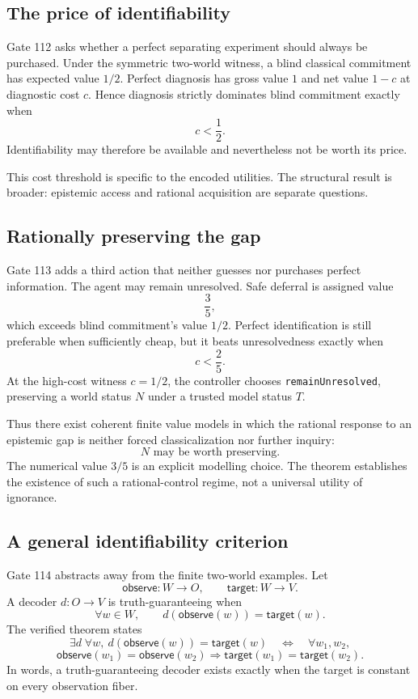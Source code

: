 \subsection{The price of identifiability}

Gate 112 asks whether a perfect separating experiment should always be purchased. Under the symmetric two-world witness, a blind classical commitment has expected value $1/2$. Perfect diagnosis has gross value $1$ and net value $1-c$ at diagnostic cost $c$. Hence diagnosis strictly dominates blind commitment exactly when
\[
c<\frac12.
\]
Identifiability may therefore be available and nevertheless not be worth its price.

This cost threshold is specific to the encoded utilities. The structural result is broader: epistemic access and rational acquisition are separate questions.

\subsection{Rationally preserving the gap}

Gate 113 adds a third action that neither guesses nor purchases perfect information. The agent may remain unresolved. Safe deferral is assigned value
\[
\frac35,
\]
which exceeds blind commitment's value $1/2$. Perfect identification is still preferable when sufficiently cheap, but it beats unresolvedness exactly when
\[
c<\frac25.
\]
At the high-cost witness $c=1/2$, the controller chooses \texttt{remainUnresolved}, preserving a world status $N$ under a trusted model status $T$.

Thus there exist coherent finite value models in which the rational response to an epistemic gap is neither forced classicalization nor further inquiry:
\[
\boxed{N\text{ may be worth preserving.}}
\]
The numerical value $3/5$ is an explicit modelling choice. The theorem establishes the existence of such a rational-control regime, not a universal utility of ignorance.

\subsection{A general identifiability criterion}

Gate 114 abstracts away from the finite two-world examples. Let
\[
\mathsf{observe}:W\to O,
\qquad
\mathsf{target}:W\to V.
\]
A decoder $d:O\to V$ is truth-guaranteeing when
\[
\forall w\in W,\qquad d(\mathsf{observe}(w))=\mathsf{target}(w).
\]
The verified theorem states
\[
\exists d\;\forall w,\ d(\mathsf{observe}(w))=\mathsf{target}(w)
\quad\Longleftrightarrow\quad
\forall w_1,w_2,
\]
\[
\mathsf{observe}(w_1)=\mathsf{observe}(w_2)
\Rightarrow
\mathsf{target}(w_1)=\mathsf{target}(w_2).
\]
In words, a truth-guaranteeing decoder exists exactly when the target is constant on every observation fiber.

